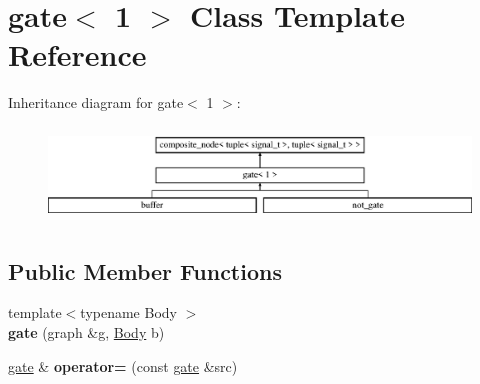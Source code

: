 \hypertarget{classgate_3_011_01_4}{}\section{gate$<$ 1 $>$ Class Template Reference}
\label{classgate_3_011_01_4}
Inheritance diagram for gate$<$ 1 $>$\+:\begin{figure}[H]
\begin{center}
\leavevmode
\includegraphics[height=2.530120cm]{classgate_3_011_01_4}
\end{center}
\end{figure}
\subsection*{Public Member Functions}
\begin{DoxyCompactItemize}
\item 
\hypertarget{classgate_3_011_01_4_a7f5069a52d54af25c84cc4449f413873}{}{\footnotesize template$<$typename Body $>$ }\\{\bfseries gate} (graph \&g, \hyperlink{classBody}{Body} b)\label{classgate_3_011_01_4_a7f5069a52d54af25c84cc4449f413873}

\item 
\hypertarget{classgate_3_011_01_4_a4400e65724acc6f2c72e45cfbc94c246}{}\hyperlink{classgate}{gate} \& {\bfseries operator=} (const \hyperlink{classgate}{gate} \&src)\label{classgate_3_011_01_4_a4400e65724acc6f2c72e45cfbc94c246}

\end{DoxyCompactItemize}
